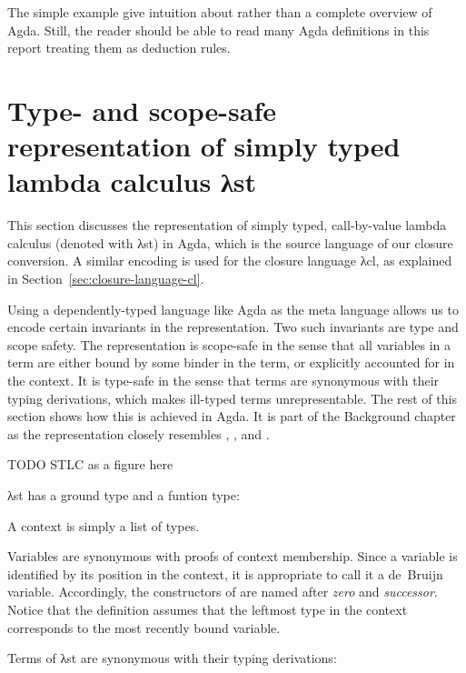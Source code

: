 \documentclass[bsc,frontabs,oneside,singlespacing,parskip,deptreport]{infthesis}
\theoremstyle{definition}
\theoremstyle{lemma}
\begin{document}
The simple example give intuition about rather than a complete
overview of Agda. Still, the reader should be able to read many Agda
definitions in this report treating them as deduction rules.

\section{Type- and scope-safe representation of simply typed lambda
  calculus λst}
\label{sec:type-scope-safe}

This section discusses the representation of simply typed,
call-by-value lambda calculus (denoted with λst) in Agda, which is the
source language of our closure conversion. A similar encoding is used
for the closure language λcl, as explained in
Section~\ref{sec:closure-language-cl}.

Using a dependently-typed language like Agda as the meta language
allows us to encode certain invariants in the representation. Two such
invariants are type and scope safety. The representation is scope-safe
in the sense that all variables in a term are either bound by some
binder in the term, or explicitly accounted for in the context. It is
type-safe in the sense that terms are synonymous with their typing
derivations, which makes ill-typed terms unrepresentable. The rest of
this section shows how this is achieved in Agda. It is part of the
Background chapter as the representation closely resembles
\cite{DBLP:conf/cpp/Allais0MM17},
\cite{DBLP:journals/pacmpl/AllaisA0MM18}, and
\cite{DBLP:conf/sbmf/Wadler18}.

TODO STLC as a figure here

λst has a ground type and a funtion type:


A context is simply a list of types.


Variables are synonymous with proofs of context membership. Since a
variable is identified by its position in the context, it is
appropriate to call it a de~Bruijn variable. Accordingly, the
constructors of  are named after \textit{zero} and
\textit{successor}. Notice that the definition assumes that the
leftmost type in the context corresponds to the most recently bound
variable.


Terms of λst are synonymous with their typing derivations:
\end{document}
